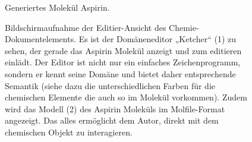  
\begin{figure}[h!]
\centering
\advance\leftskip-2.5cm
\caption{ Generiertes Molekül Aspirin. }\label{Aspirin}
\end{figure}
 
\begin{figure}[h!]
\centering
\advance\leftskip-2.5cm
\caption[Bildschirmaufnahme Chemie-Dokumentelement]{ Bildschirmaufnahme der Editier-Ansicht des Chemie-Dokumentelements. Es ist der Domäneneditor „Ketcher“ (1) zu sehen, der gerade das Aspirin Molekül anzeigt und zum editieren einlädt. Der Editor ist nicht nur ein einfaches Zeichenprogramm, sondern er kennt seine Domäne und bietet daher entsprechende Semantik (siehe dazu die unterschiedlichen Farben für die chemischen Elemente die auch so im Molekül vorkommen). Zudem wird das Modell (2) des Aspirin Moleküls im Molfile-Format angezeigt. Das alles ermöglicht dem Autor, direkt mit dem chemischen Objekt zu interagieren. }\label{chemieeditieren}
\end{figure}
 
